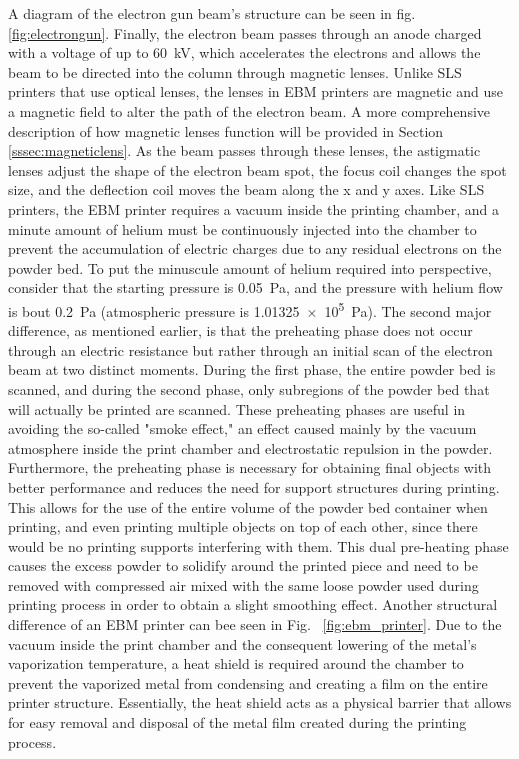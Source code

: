 A diagram of the electron gun beam's structure can be seen in fig. \ref{fig:electrongun}. Finally, the electron beam passes through an anode charged with a voltage of up to \SI{60}{\kilo\volt}, which accelerates the electrons and allows the beam to be directed into the column through magnetic lenses. Unlike SLS printers that use optical lenses, the lenses in EBM printers are magnetic and use a magnetic field to alter the path of the electron beam. A more comprehensive description of how magnetic lenses function will be provided in Section \ref{sssec:magneticlens}. As the beam passes through these lenses, the astigmatic lenses adjust the shape of the electron beam spot, the focus coil changes the spot size, and the deflection coil moves the beam along the x and y axes. Like SLS printers, the EBM printer requires a vacuum inside the printing chamber, and a minute amount of helium must be continuously injected into the chamber to prevent the accumulation of electric charges due to any residual electrons on the powder bed. To put the minuscule amount of helium required into perspective, consider that the starting pressure is \SI{0,05}{\pascal}, and the pressure with helium flow is bout \SI{0,2}{\pascal} (atmospheric pressure is \SI{1,01325e5}{\pascal}). The second major difference, as mentioned earlier, is that the preheating phase does not occur through an electric resistance but rather through an initial scan of the electron beam at two distinct moments. During the first phase, the entire powder bed is scanned, and during the second phase, only subregions of the powder bed that will actually be printed are scanned. These preheating phases are useful in avoiding the so-called "smoke effect," an effect caused mainly by the vacuum atmosphere inside the print chamber and electrostatic repulsion in the powder. Furthermore, the preheating phase is necessary for obtaining final objects with better performance and reduces the need for support structures during printing. This allows for the use of the entire volume of the powder bed container when printing, and even printing multiple objects on top of each other, since there would be no printing supports interfering with them. This dual pre-heating phase causes the excess powder to solidify around the printed piece and need to be removed with compressed air mixed with the same loose powder used during printing process in order to obtain a slight smoothing effect.  Another structural difference of an EBM printer can bee seen in Fig. ~\ref{fig:ebm_printer}. Due to the vacuum inside the print chamber and the consequent lowering of the metal's vaporization temperature, a heat shield is required around the chamber to prevent the vaporized metal from condensing and creating a film on the entire printer structure. Essentially, the heat shield acts as a physical barrier that allows for easy removal and disposal of the metal film created during the printing process.
